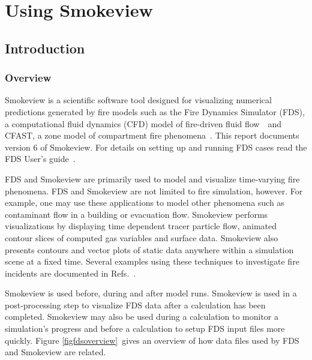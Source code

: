\documentclass[11pt,twoside]{book}
\begin{document}
\cleardoublepage
\tableofcontents

\cleardoublepage
\listoffigures

\cleardoublepage
\listoftables

\mainmatter



\part{Using Smokeview}
\chapter{Introduction}
\section{Overview}
Smokeview is a scientific software tool designed for visualizing
numerical predictions generated by fire models such as the Fire
Dynamics Simulator (FDS), a computational fluid dynamics (CFD)
model of fire-driven fluid flow~\cite{FDS_Tech_Guide}\ and CFAST, a
zone model of compartment fire phenomena~\cite{CFAST_Tech_Guide_7}. This
report documents version 6 of Smokeview. For details on setting up
and running FDS cases read the FDS User's
guide~\cite{FDS_Users_Guide}.

FDS and Smokeview are primarily used to model and visualize
time-varying fire phenomena. FDS and Smokeview are not limited to
fire simulation, however. For example, one may use these
applications to model other phenomena such as contaminant flow in
a building or evacuation flow. Smokeview performs visualizations
by displaying time dependent tracer particle flow, animated
contour slices of computed gas variables and surface data.
Smokeview also presents contours and vector plots of static data
anywhere within a simulation scene at a fixed time. Several
examples using these techniques to investigate fire incidents are
documented in Refs.~\cite{CHERRYROAD,Iowa,HOUSTON,WTC}.

Smokeview is used before, during and after model runs. Smokeview
is used in a post-processing step to visualize FDS data after a
calculation has been completed. Smokeview  may also be used during
a calculation to monitor a simulation's progress and before a
calculation to setup FDS input files more quickly.  Figure
\ref{figfdsoverview}\ gives an overview of how data files used by
FDS and Smokeview are related.
\end{document}
